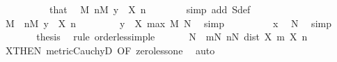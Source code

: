 \begin{isabellebody}
\ \ \isamarkupfalse%
\ {\isacharminus}{\kern0pt}\isanewline
\ \ \ \ \isamarkupfalse%
\ that\ \isamarkupfalse%
\ {\isachardoublequoteopen}{\isasymexists}M{\isachardot}{\kern0pt}\ {\isasymforall}n{\isasymge}M{\isachardot}{\kern0pt}\ y\ {\isacharless}{\kern0pt}\ X\ n{\isachardoublequoteclose}\isanewline
\ \ \ \ \ \ \isamarkupfalse%
\ {\isacharparenleft}{\kern0pt}simp\ add{\isacharcolon}{\kern0pt}\ S{\isacharunderscore}{\kern0pt}def{\isacharparenright}{\kern0pt}\isanewline
\ \ \ \ \isamarkupfalse%
\ \isamarkupfalse%
\ M\ \ {\isachardoublequoteopen}{\isasymforall}n{\isasymge}M{\isachardot}{\kern0pt}\ y\ {\isacharless}{\kern0pt}\ X\ n{\isachardoublequoteclose}\ \isacommand{{\isachardot}{\kern0pt}{\isachardot}{\kern0pt}}\isamarkupfalse%
\isanewline
\ \ \ \ \isamarkupfalse%
\ \isamarkupfalse%
\ {\isachardoublequoteopen}y\ {\isacharless}{\kern0pt}\ X\ {\isacharparenleft}{\kern0pt}max\ M\ N{\isacharparenright}{\kern0pt}{\isachardoublequoteclose}\ \isamarkupfalse%
\ simp\isanewline
\ \ \ \ \isamarkupfalse%
\ \isamarkupfalse%
\ {\isachardoublequoteopen}{\isasymdots}\ {\isacharless}{\kern0pt}\ x{\isachardoublequoteclose}\ \isamarkupfalse%
\ N\ \isamarkupfalse%
\ simp\isanewline
\ \ \ \ \isamarkupfalse%
\ \isamarkupfalse%
\ {\isacharquery}{\kern0pt}thesis\ \isamarkupfalse%
\ {\isacharparenleft}{\kern0pt}rule\ order{\isacharunderscore}{\kern0pt}less{\isacharunderscore}{\kern0pt}imp{\isacharunderscore}{\kern0pt}le{\isacharparenright}{\kern0pt}\isanewline
\ \ \isamarkupfalse%
\isanewline
\isanewline
\ \ \isamarkupfalse%
\ N\ \ {\isachardoublequoteopen}{\isasymforall}m{\isasymge}N{\isachardot}{\kern0pt}\ {\isasymforall}n{\isasymge}N{\isachardot}{\kern0pt}\ dist\ {\isacharparenleft}{\kern0pt}X\ m{\isacharparenright}{\kern0pt}\ {\isacharparenleft}{\kern0pt}X\ n{\isacharparenright}{\kern0pt}\ {\isacharless}{\kern0pt}\ {}{\isachardoublequoteclose}\isanewline
\ \ \ \ \isamarkupfalse%
\ X{\isacharbrackleft}{\kern0pt}THEN\ metric{\isacharunderscore}{\kern0pt}CauchyD{\isacharcomma}{\kern0pt}\ OF\ zero{\isacharunderscore}{\kern0pt}less{\isacharunderscore}{\kern0pt}one{\isacharbrackright}{\kern0pt}\ \isamarkupfalse%
\ auto\isanewline
\ \ \isamarkupfalse%
\ \isamarkupfalse%

\end{isabellebody}
